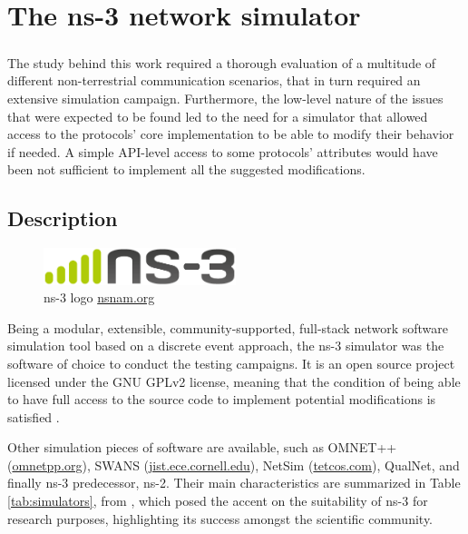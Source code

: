 
\chapter{The ns-3 network simulator}
\label{chp:ns3}

\paragraph{}
The study behind this work required a thorough evaluation of a multitude of different non-terrestrial communication scenarios, that in turn required an extensive simulation campaign. Furthermore, the low-level nature of the issues that were expected to be found led to the need for a simulator that allowed access to the protocols' core implementation to be able to modify their behavior if needed. A simple API-level access to some protocols' attributes would have been not sufficient to implement all the suggested modifications.

\section{Description}
\label{sec:ns3_desc}

\begin{figure}[ht]
    \centering
    \includegraphics[width=0.5\textwidth]{res/ns-3-notext.png}
    \caption{ns-3 logo \href{https://www.nsnam.org/}{nsnam.org}}
    \label{fig:ns3-logo}
\end{figure}

Being a modular, extensible, community-supported, full-stack network software simulation tool based on a discrete event approach, the ns-3 simulator was the software of choice to conduct the testing campaigns. It is an open source project licensed under the GNU GPLv2 license, meaning that the condition of being able to have full access to the source code to implement potential modifications is satisfied \cite{ns3-website}.

Other simulation pieces of software are available, such as OMNET++ (\href{https://omnetpp.org/}{omnetpp.org}), SWANS (\href{http://jist.ece.cornell.edu/}{jist.ece.cornell.edu}), NetSim (\href{https://www.tetcos.com/}{tetcos.com}), QualNet, and finally ns-3 predecessor, ns-2. Their main characteristics are summarized in Table \ref{tab:simulators}, from \cite{review-ns3}, which posed the accent on the suitability of ns-3 for research purposes, highlighting its success amongst the scientific community.

